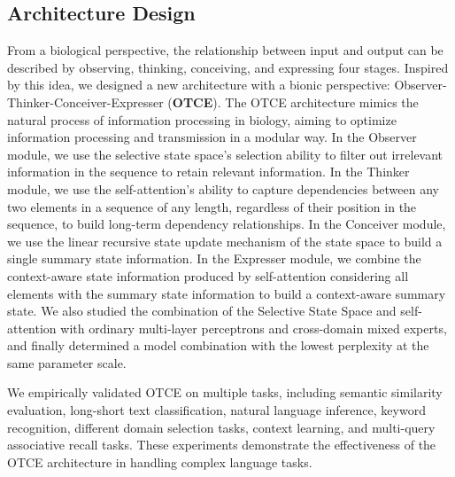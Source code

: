 \documentclass{article}
\theoremstyle{plain}
\theoremstyle{definition}
\theoremstyle{remark}
\begin{document}
\subsection{Architecture Design}

From a biological perspective, the relationship between input and output can be described by observing, thinking, conceiving, and expressing four stages. Inspired by this idea, we designed a new architecture with a bionic perspective: Observer-Thinker-Conceiver-Expresser (\textbf{OTCE}). The OTCE architecture mimics the natural process of information processing in biology, aiming to optimize information processing and transmission in a modular way. In the Observer module, we use the selective state space's selection ability to filter out irrelevant information in the sequence to retain relevant information. In the Thinker module, we use the self-attention's ability to capture dependencies between any two elements in a sequence of any length, regardless of their position in the sequence, to build long-term dependency relationships. In the Conceiver module, we use the linear recursive state update mechanism of the state space to build a single summary state information. In the Expresser module, we combine the context-aware state information produced by self-attention considering all elements with the summary state information to build a context-aware summary state. We also studied the combination of the Selective State Space and self-attention with ordinary multi-layer perceptrons and cross-domain mixed experts, and finally determined a model combination with the lowest perplexity at the same parameter scale.

We empirically validated OTCE on multiple tasks, including semantic similarity evaluation, long-short text classification, natural language inference, keyword recognition, different domain selection tasks, context learning, and multi-query associative recall tasks. These experiments demonstrate the effectiveness of the OTCE architecture in handling complex language tasks.
\end{document}
